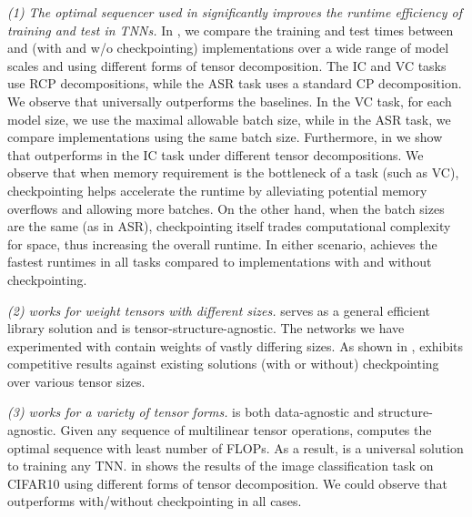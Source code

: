 \emph{(1) The optimal sequencer used in \conveinsum significantly improves the runtime efficiency of training and test in TNNs.} 
In , we compare the training and test times between \conveinsum and \pytorch (with and w/o checkpointing) implementations over a wide range of model scales and using different forms of tensor decomposition. The IC and VC tasks use RCP decompositions, while the ASR task uses a standard CP decomposition. 
We observe that \conveinsum universally outperforms the baselines. In the VC task, for each model size, we use the maximal allowable batch size, while in the ASR task, we compare implementations using the same batch size. Furthermore, in  we show that \conveinsum outperforms \pytorch in the IC task under different tensor decompositions.
We observe that when memory requirement is the bottleneck of a task (such as VC), checkpointing helps accelerate the runtime by alleviating potential memory overflows and allowing more batches. On the other hand, when the batch sizes are the same (as in ASR), checkpointing itself trades computational complexity for space, thus increasing the overall runtime. In either scenario, \conveinsum achieves the fastest runtimes in all tasks compared to \pytorch implementations with and without checkpointing.

\emph{(2) \autotnn works for weight tensors with different sizes.}
\autotnn serves as a general efficient library solution and is tensor-structure-agnostic. The networks we have experimented with contain weights of vastly differing sizes. As shown in , \autotnn exhibits competitive results against existing \pytorch solutions (with or without) checkpointing over various tensor sizes.

\emph{(3) \autotnn works for a variety of tensor forms.}
\conveinsum is both data-agnostic and structure-agnostic. Given any sequence of multilinear tensor operations, \conveinsum computes the optimal sequence with least number of FLOPs. As a result, \conveinsum is a universal solution to training any TNN.  in  shows the results of the image classification task on CIFAR10 using different forms of tensor decomposition. We could observe that \conveinsum outperforms \pytorch with/without checkpointing in all cases. 
